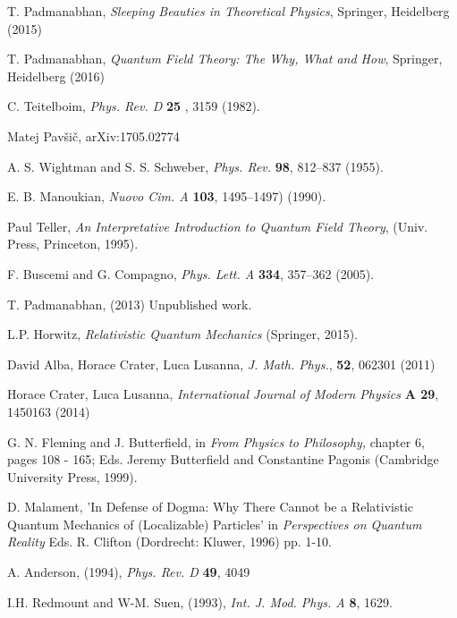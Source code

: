\documentclass{article}
\begin{document}
\begin{thebibliography}{000}
T. Padmanabhan, \textit{Sleeping Beauties in Theoretical Physics}, Springer, Heidelberg (2015)

 
T. Padmanabhan, \textit{Quantum Field Theory: The Why, What and How}, Springer, Heidelberg (2016)
 
 C. Teitelboim, \textit{Phys. Rev. D} \textbf{25} , 3159 (1982). 


  Matej  Pav\v si\v c, arXiv:1705.02774

  A. S. Wightman and S. S. Schweber, {\it Phys. Rev.} {\bf 98}, 812--837 (1955).
 
  E. B. Manoukian,  {\it Nuovo Cim. A} {\bf 103},
1495--1497) (1990).
 
  Paul Teller, {\it An Interpretative Introduction to Quantum Field Theory},
(Univ. Press, Princeton, 1995).
 
  F. Buscemi and G. Compagno, 
{\it Phys. Lett. A} {\bf 334}, 357--362 (2005).

T. Padmanabhan, (2013) Unpublished work.


L.P. Horwitz, \textit{Relativistic Quantum Mechanics} (Springer, 2015).


David Alba, Horace Crater, Luca Lusanna, \textit{J. Math. Phys.}, \textbf{52}, 062301 (2011)  

Horace Crater, Luca Lusanna,
\textit{International Journal of Modern Physics} \textbf{A 29}, 1450163 (2014)


G. N. Fleming and J. Butterfield, in \textit{From Physics to Philosophy,} chapter 6, pages 108 - 165; Eds. Jeremy Butterfield and Constantine
Pagonis (Cambridge University
Press, 1999).

D. Malament, 'In Defense of Dogma: Why There Cannot be a Relativistic
Quantum Mechanics of (Localizable) Particles' in \textit{Perspectives
on Quantum Reality} Eds. R. Clifton (Dordrecht: Kluwer, 1996) pp. 1-10.

  A. Anderson, (1994), \textit{Phys. Rev. D} \textbf{49}, 4049

   I.H. Redmount and W-M. Suen, (1993), \textit{Int. J. Mod. Phys. A} \textbf{8}, 1629.


\end{thebibliography}
\end{document}
